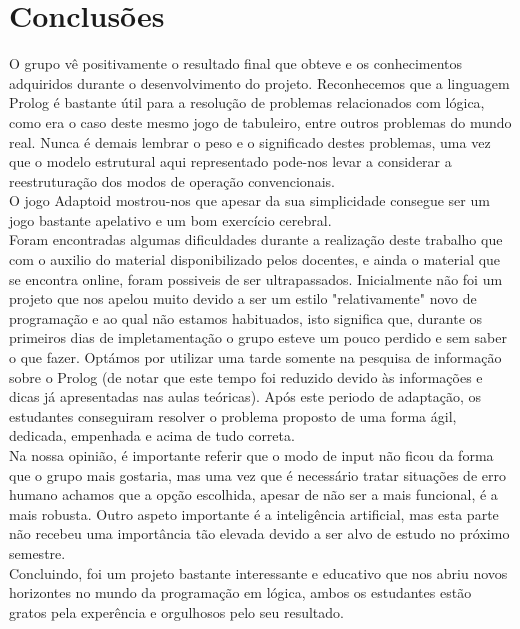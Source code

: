 \documentclass[a4paper]{article}
\begin{document}
\newpage
\section{Conclusões}
O grupo vê positivamente o resultado final que obteve e os conhecimentos adquiridos durante o desenvolvimento do projeto. Reconhecemos que a linguagem Prolog é bastante útil para a resolução de problemas relacionados com lógica, como era o caso deste mesmo jogo de tabuleiro, entre outros problemas do mundo real. Nunca é demais lembrar o peso e o significado destes problemas, uma vez que o modelo estrutural aqui representado pode-nos levar a considerar a reestruturação dos modos de operação convencionais.
\\

O jogo Adaptoid mostrou-nos que apesar da sua simplicidade consegue ser um jogo bastante apelativo e um bom exercício cerebral.
\\

Foram encontradas algumas dificuldades durante a realização deste trabalho que com o auxilio do material disponibilizado pelos docentes, e ainda o material que se encontra online, foram possiveis de ser ultrapassados. Inicialmente não foi um projeto que nos apelou muito devido a ser um estilo "relativamente" novo de programação e ao qual não estamos habituados, isto significa que, durante os primeiros dias de impletamentação o grupo esteve um pouco perdido e sem saber o que fazer. Optámos por utilizar uma tarde somente na pesquisa de informação sobre o Prolog (de notar que este tempo foi reduzido devido às informações e dicas já apresentadas nas aulas teóricas). Após este periodo de adaptação, os estudantes conseguiram resolver o problema proposto de uma forma ágil, dedicada, empenhada e acima de tudo correta.
\\

Na nossa opinião, é importante referir que o modo de input não ficou da forma que o grupo mais gostaria, mas uma vez que é necessário tratar situações de erro humano achamos que a opção escolhida, apesar de não ser a mais funcional, é a mais robusta. Outro aspeto importante é a inteligência artificial, mas esta parte não recebeu uma importância tão elevada devido a ser alvo de estudo no próximo semestre.
\\

Concluindo, foi um projeto bastante interessante e educativo que nos abriu novos horizontes no mundo da programação em lógica, ambos os estudantes estão gratos pela experência e orgulhosos pelo seu resultado.
\end{document}

